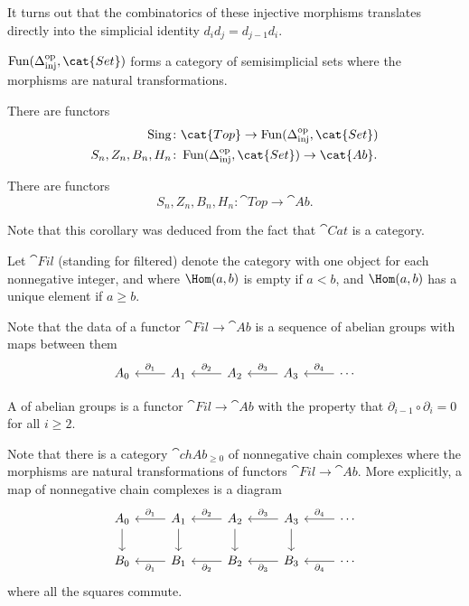 \documentclass{standalone}
\begin{document}
It turns out that the combinatorics of these injective morphisms translates
directly into the simplicial identity \(d_i d_j = d_{j-1} d_i\).

\begin{remark}
  \(\Fun(\Deltainj^\op, \cat{Set})\) forms a category of semisimplicial sets
  where the morphisms are natural transformations.
\end{remark}

\begin{theorem}
  There are functors
  \begin{align*}
    \Sing &\colon \cat{Top} \to \Fun(\Deltainj^\op, \cat{Set}) \\
    S_n, Z_n, B_n, H_n &\colon \Fun(\Deltainj^\op, \cat{Set}) \to \cat{Ab}.
  \end{align*}
\end{theorem}

\begin{corollary}
  There are functors
  \[
    S_n, Z_n, B_n, H_n \colon \cat{Top} \to \cat{Ab}.
  \]
\end{corollary}
Note that this corollary was deduced from the fact that \(\cat{Cat}\)
is a category.

\begin{definition}
  Let \(\cat{Fil}\) (standing for filtered) denote the category with one object
  for each nonnegative integer, and where \(\Hom(a, b)\) is empty if \(a < b\),
  and \(\Hom(a, b)\) has a unique element if \(a \geq b\).
\end{definition}
Note that the data of a functor \(\cat{Fil} \to \cat{Ab}\) is a sequence of
abelian groups with maps between them
\[
  \begin{tikzcd}
    A_0 &
    A_1 \ar[l, "\partial_1", swap] &
    A_2 \ar[l, "\partial_2", swap] &
    A_3 \ar[l, "\partial_3", swap] &
    \cdots \ar[l, "\partial_4", swap]
  \end{tikzcd}
\]

\begin{definition}
  A  of abelian groups is
  a functor \(\cat{Fil} \to \cat{Ab}\) with the property that
  \(\partial_{i - 1} \circ \partial_i = 0\) for all \(i \geq 2\).
\end{definition}

Note that there is a category \(\cat{chAb}_{\geq 0}\) of
nonnegative chain complexes where the morphisms are
natural transformations of functors \(\cat{Fil} \to \cat{Ab}\).
More explicitly, a map of nonnegative chain complexes is a diagram
\[
  \begin{tikzcd}
    A_0 \ar[d] &
      A_1 \ar[l, "\partial_1", swap] \ar[d] &
      A_2 \ar[l, "\partial_2", swap] \ar[d] &
      A_3 \ar[l, "\partial_3", swap] \ar[d] &
      \cdots \ar[l, "\partial_4", swap] \\
    B_0 &
      B_1 \ar[l, "\partial_1"] &
      B_2 \ar[l, "\partial_2"] &
      B_3 \ar[l, "\partial_3"] &
      \cdots \ar[l, "\partial_4"]
  \end{tikzcd}
\]
where all the squares commute.
\end{document}
